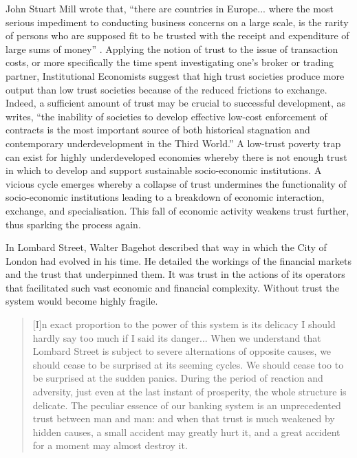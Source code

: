 \begin{subappendices}
John Stuart Mill wrote that, ``there are countries in Europe... where the most serious impediment to conducting business concerns on a large scale, is the rarity of persons who are supposed fit to be trusted with the receipt and expenditure of large sums of money'' \citep[p.~132]{Mill1848}. Applying the notion of trust to the issue of transaction costs, or more specifically the time spent investigating one's broker or trading partner, Institutional Economists suggest that high trust societies produce more output than low trust societies because of the reduced frictions to exchange. Indeed, a sufficient amount of trust may be crucial to successful development, as \citet[p.~54]{North1990} writes, ``the inability of societies to develop effective low-cost enforcement of contracts is the most important source of both historical stagnation and contemporary underdevelopment in the Third World.'' A low-trust poverty trap can exist for highly underdeveloped economies whereby there is not enough trust in which to develop and support sustainable socio-economic institutions. A vicious cycle emerges whereby a collapse of trust undermines the functionality of socio-economic institutions leading to a breakdown of economic interaction, exchange, and specialisation. This fall of economic activity weakens trust further, thus sparking the process again.

In Lombard Street, Walter Bagehot described that way in which the City of London had evolved in his time. He detailed the workings of the financial markets and the trust that underpinned them. It was trust in the actions of its operators that facilitated such vast economic and financial complexity. Without trust the system would become highly fragile.

\begin{quote}
[I]n exact proportion to the power of this system is its delicacy I should hardly say too much if I said its danger... When we understand that Lombard Street is subject to severe alternations of opposite causes, we should cease to be surprised at its seeming cycles. We should cease too to be surprised at the sudden panics. During the period of reaction and adversity, just even at the last instant of prosperity, the whole structure is delicate. The peculiar essence of our banking system is an unprecedented trust between man and man: and when that trust is much weakened by hidden causes, a small accident may greatly hurt it, and a great accident for a moment may almost destroy it. 

\begin{flushright}
\citet[p.~87--88]{Bagehot1873}
\end{flushright}
\end{quote}


\end{subappendices}
